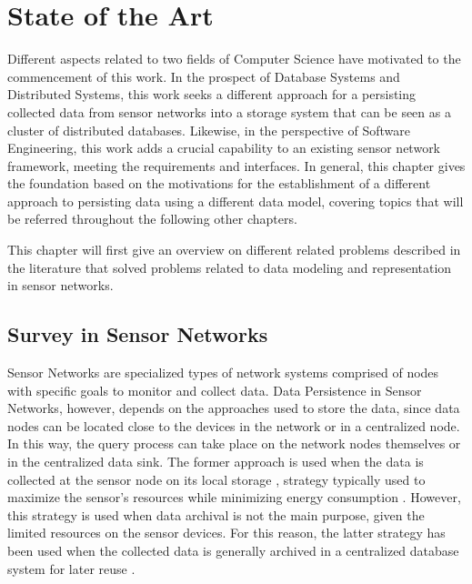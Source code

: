 

\chapter{State of the Art}

Different aspects related to two fields of Computer Science have motivated to
the commencement of this work. In the prospect of Database Systems and
Distributed Systems, this work seeks a different approach for a persisting
collected data from sensor networks into a storage system that can be seen as a
cluster of distributed databases. Likewise, in the perspective of Software
Engineering, this work adds a crucial capability to an existing sensor network
framework, meeting the requirements and interfaces. In general, this chapter
gives the foundation based on the motivations for the establishment of a
different approach to persisting data using a different data model, covering
topics that will be referred throughout the following other chapters.

This chapter will first give an overview on different related problems
described in the literature that solved problems related to data modeling and
representation in sensor networks.

\section{Survey in Sensor Networks}

Sensor Networks are specialized types of network systems comprised of nodes
with specific goals to monitor and collect data. Data Persistence in Sensor
Networks, however, depends on the approaches used to store the data, since data
nodes can be located close to the devices in the network or in a centralized
node. In this way, the query process can take place on the network nodes
themselves or in the centralized data sink. The former approach is used when
the data is collected at the sensor node on its local storage
\cite{sn-storage01}\cite{sn-storage03}, strategy typically used to maximize
the sensor's resources while minimizing energy consumption
\cite{sn-storage04}. However, this strategy is used when data archival is not
the main purpose, given the limited resources on the sensor devices. For this
reason, the latter strategy has been used when the collected data is generally
archived in a centralized database system for later reuse \cite{sn-storage02}.

